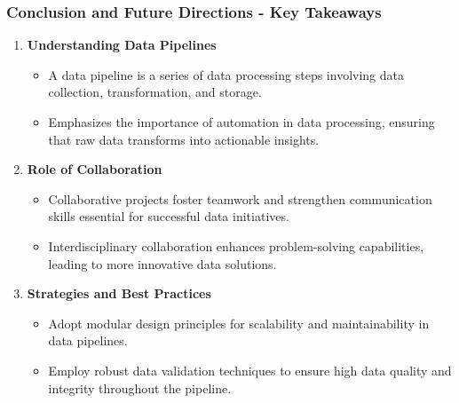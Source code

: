 \documentclass{beamer}
\begin{document}
\begin{frame}[fragile]
    \frametitle{Conclusion and Future Directions - Key Takeaways}
    \begin{enumerate}
        \item \textbf{Understanding Data Pipelines}
        \begin{itemize}
            \item A data pipeline is a series of data processing steps involving data collection, transformation, and storage.
            \item Emphasizes the importance of automation in data processing, ensuring that raw data transforms into actionable insights.
        \end{itemize}
        
        \item \textbf{Role of Collaboration}
        \begin{itemize}
            \item Collaborative projects foster teamwork and strengthen communication skills essential for successful data initiatives.
            \item Interdisciplinary collaboration enhances problem-solving capabilities, leading to more innovative data solutions.
        \end{itemize}
        
        \item \textbf{Strategies and Best Practices}
        \begin{itemize}
            \item Adopt modular design principles for scalability and maintainability in data pipelines.
            \item Employ robust data validation techniques to ensure high data quality and integrity throughout the pipeline.
        \end{itemize}
    \end{enumerate}
\end{frame}
\end{document}
